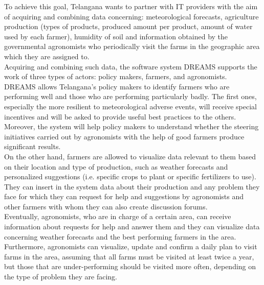 \documentclass[a4paper,11pt]{report}
\begin{document}
To achieve this goal, Telangana wants to partner with IT providers with the aim of acquiring and combining data concerning: meteorological forecasts, agriculture production (types of products, produced amount per product, amount of water used by each farmer), humidity of soil and information obtained by the governmental agronomists who periodically visit the farms in the geographic area which they are assigned to.\\
Acquiring and combining such data, the software system DREAMS supports the work of three types of actors: policy makers, farmers, and agronomists.\\

DREAMS allows Telangana’s policy makers to  identify farmers who are performing well and those who are performing particularly badly. The first ones, especially the more resilient to meteorological adverse events, will receive special incentives and will be asked to provide useful best practices to the others. Moreover, the system will help policy makers to understand whether the steering initiatives carried out by agronomists with the help of good farmers produce significant results.\\

On the other hand, farmers are allowed to visualize data relevant to them based on their location and type of production, such as weather forecasts and personalized suggestions (i.e. specific crops to plant or specific fertilizers to use). They can insert in the system data about their production and any problem they face for which they can request for help and suggestions by agronomists and other farmers with whom they can also create discussion forums.\\

Eventually, agronomists, who are in charge of a certain area, can receive information about requests for help and answer them and they can visualize data concerning weather forecasts and the best performing farmers in the area. Furthermore, agronomists can visualize, update and confirm a daily plan to visit farms in the area, assuming that all farms must be visited at least twice a year, but those that are under-performing should be visited more often, depending on the type of problem they are facing.
\end{document}
